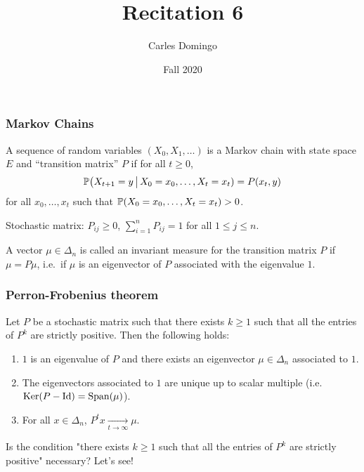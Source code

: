 \documentclass{beamer}
\title{Recitation 6}
\author{Carles Domingo}
\date{Fall 2020}
\begin{document}
\frame{\titlepage} 

\setcounter{showProgressBar}{0}
\setcounter{showSlideNumbers}{1}

\begin{frame}[t]
\frametitle{Markov Chains}
\begin{definition}
	A sequence of random variables $(X_0, X_1, \dots)$ is a Markov chain with state space $E$ and ``transition matrix'' $P$ if for all $t \geq 0$, 
	$$
	\P\big( X_{t+1} = y \, \big| \, X_0= x_0, \dots, X_t = x_t ) = P(x_t,y)
	$$
	for all $x_0, \dots, x_t$ such that $\P(X_0 = x_0, \dots, X_t = x_t) >0$.
\end{definition}
Stochastic matrix: $P_{ij} \geq 0$, $\sum_{i=1}^n P_{ij} = 1$ for all $1 \leq j \leq n$.
\begin{definition}
	A vector $\mu \in \Delta_n$ is called an invariant measure for the transition matrix $P$ if $\mu = P \mu$, i.e.\ if $\mu$ is an eigenvector of $P$ associated with the eigenvalue $1$.
\end{definition}
\end{frame}

\begin{frame}[t]
\frametitle{Perron-Frobenius theorem}
\begin{theorem}\label{th:perron_frobenius}
	Let $P$ be a stochastic matrix such that there exists $k \geq 1$ such that all the entries of $P^k$ are strictly positive. Then the following holds:
	\begin{enumerate}
		\item $1$ is an eigenvalue of $P$ and there exists an eigenvector $\mu \in \Delta_n$ associated to $1$.
		\item The eigenvectors associated to $1$ are unique up to scalar multiple (i.e.\ $\Ker(P-\Id) = \Span(\mu)$).
		\item For all $x \in \Delta_n$, $P^t x \xrightarrow[t \to \infty]{} \mu$.
	\end{enumerate}
\end{theorem}
Is the condition "there exists $k \geq 1$ such that all the entries of $P^k$ are strictly positive" necessary? Let's see!
\end{frame}
\end{document}
